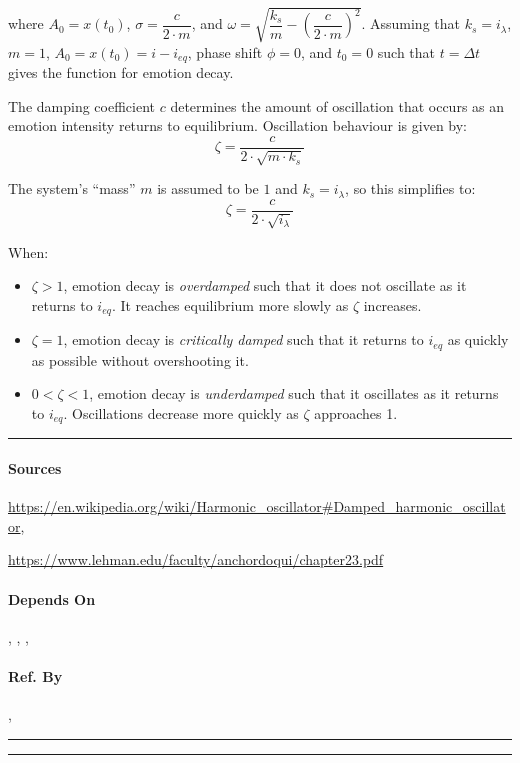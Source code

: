 where $A_0 = x\left(t_0\right)$, $\sigma = \dfrac{c}{2 \cdot m}$, and $\omega =
\sqrt{\dfrac{k_s}{m} - \left(\dfrac{c}{2 \cdot m}\right)^2}$. Assuming that
$k_s = i_\lambda$, $m = 1$, $A_0 = x\left(t_0\right) = i - i_{eq}$, phase shift
$\phi = 0$, and $t_0 = 0$ such that $t = \Delta t$ gives the function for
emotion decay.

The damping coefficient $c$ determines the amount of oscillation that occurs as
an emotion intensity returns to equilibrium. Oscillation behaviour is given by:
$$\zeta = \frac{c}{2 \cdot \sqrt{m \cdot k_s}}$$

The system's ``mass'' $m$ is assumed to be $1$ and $k_s = i_\lambda$, so this
simplifies to:
$$\zeta = \dfrac{c}{2 \cdot \sqrt{i_\lambda}}$$

When:
\begin{itemize}
    \item $\zeta > 1$, emotion decay is \textit{overdamped} such that it does
    not oscillate as it returns to $i_{eq}$. It reaches equilibrium more slowly
    as $\zeta$ increases.

    \item $\zeta = 1$, emotion decay is \textit{critically damped} such that it
    returns to $i_{eq}$ as quickly as possible without overshooting it.

    \item $0 < \zeta < 1$, emotion decay is \textit{underdamped} such that it
    oscillates as it returns to $i_{eq}$. Oscillations decrease more quickly as
    $\zeta$ approaches 1.
\end{itemize}
\hrule

\paragraph{Sources}
{\small\url{https://en.wikipedia.org/wiki/Harmonic_oscillator#Damped_harmonic_oscillator},

    \url{https://www.lehman.edu/faculty/anchordoqui/chapter23.pdf}}

\paragraph{Depends On} , ,
, 

\paragraph{Ref. By} , 
\\\hrule\vspace{0.5mm}\hrule

